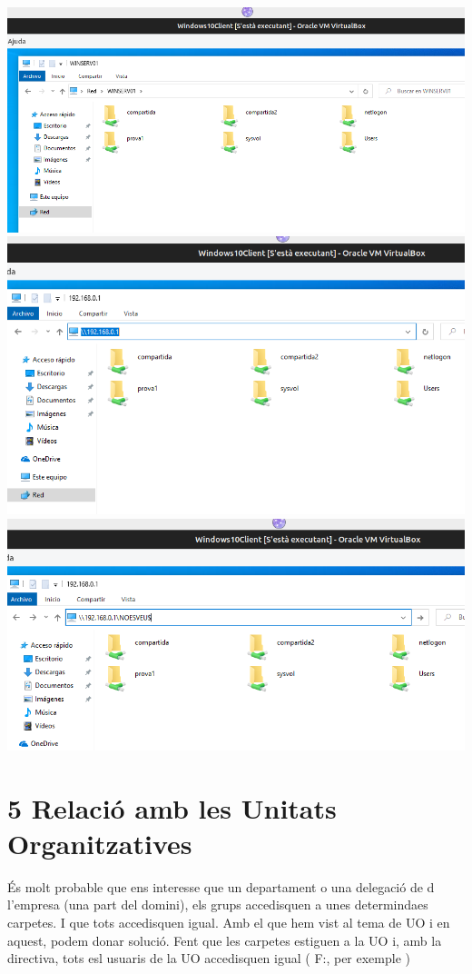 \documentclass[
  a4paper,
]{article}
\begin{document}
\includegraphics{png/CarpetesCompartidesDesdeWin10.png}
\includegraphics{png/CarpetesCompartidesDesdeWin10IP.png}
\includegraphics{png/CarpetesCompartidesOcultesDesdeWin10.png}

\section{5 Relació amb les Unitats
Organitzatives}\label{relaciuxf3-amb-les-unitats-organitzatives}

És molt probable que ens interesse que un departament o una delegació de
d l'empresa (una part del domini), els grups accedisquen a unes
determindaes carpetes. I que tots accedisquen igual. Amb el que hem vist
al tema de UO i en aquest, podem donar solució. Fent que les carpetes
estiguen a la UO i, amb la directiva, tots esl usuaris de la UO
accedisquen igual ( F:, per exemple )
\end{document}
